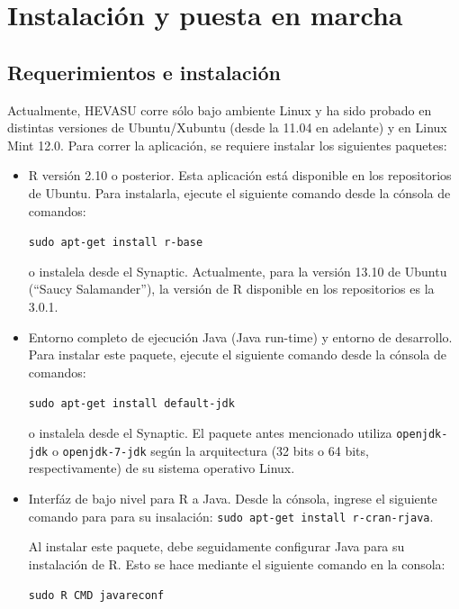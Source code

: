 \documentclass[letterpaper,12pt]{book}
\newcommand{\comando}[1]
{\textcolor{commandcolor}{\texttt{#1}}}
\begin{document}
\chapter{Instalación y puesta en marcha}
\section{Requerimientos e instalación}
Actualmente, HEVASU corre sólo bajo ambiente Linux y ha sido probado en distintas versiones de Ubuntu/Xubuntu (desde la 11.04 en adelante) y en Linux Mint 12.0. Para correr la aplicación, se requiere instalar los siguientes paquetes:

\begin{itemize}
	\item R versión 2.10 o posterior. Esta aplicación está disponible en los repositorios de Ubuntu. Para instalarla, ejecute el siguiente comando desde la cónsola de comandos: 

	\begin{center}
	  \comando{sudo apt-get install r-base}
	\end{center}
	
	\noindent{}o instalela desde el Synaptic. Actualmente, para la versión 13.10 de Ubuntu (``Saucy Salamander''), la versión de R disponible en los repositorios es la 3.0.1.
	
	\item Entorno completo de ejecución Java (Java run-time) y entorno de desarrollo. Para instalar este paquete, ejecute el siguiente comando desde la cónsola de comandos:
	
	\begin{center}
	  \comando{sudo apt-get install default-jdk}
	\end{center}
	
	\noindent{}o instalela desde el Synaptic. El paquete antes mencionado utiliza \texttt{openjdk-jdk} o \texttt{openjdk-7-jdk} según la arquitectura (32 bits o 64 bits, respectivamente) de su sistema operativo Linux.
	
	\item Interfáz de bajo nivel para R a Java. Desde la cónsola, ingrese el siguiente comando para para su insalación: \comando{sudo apt-get install r-cran-rjava}.
	
	\noindent{}Al instalar este paquete, debe seguidamente configurar Java para su instalación de R. Esto se hace mediante el siguiente comando en la consola:

	\begin{center}
		\comando{sudo R CMD javareconf}
	\end{center}
	

\end{itemize}
\end{document}
